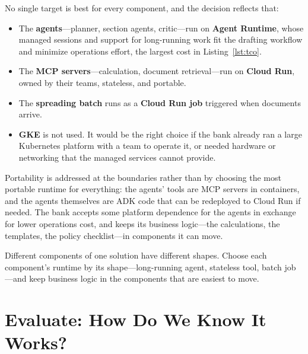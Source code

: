 No single target is best for every component, and the decision reflects that:
\begin{itemize}[itemsep=1pt]
  \item The \textbf{agents}---planner, section agents, critic---run on \textbf{Agent Runtime}, whose managed sessions and support for long-running work fit the drafting workflow and minimize operations effort, the largest cost in Listing~\ref{lst:tco}.
  \item The \textbf{MCP servers}---calculation, document retrieval---run on \textbf{Cloud Run}, owned by their teams, stateless, and portable.
  \item The \textbf{spreading batch} runs as a \textbf{Cloud Run job} triggered when documents arrive.
  \item \textbf{GKE} is not used. It would be the right choice if the bank already ran a large Kubernetes platform with a team to operate it, or needed hardware or networking that the managed services cannot provide.
\end{itemize}

Portability is addressed at the boundaries rather than by choosing the most portable runtime for everything: the agents' tools are MCP servers in containers, and the agents themselves are ADK code that can be redeployed to Cloud Run if needed. The bank accepts some platform dependence for the agents in exchange for lower operations cost, and keeps its business logic---the calculations, the templates, the policy checklist---in components it can move.

\begin{principle}
Different components of one solution have different shapes. Choose each component's runtime by its shape---long-running agent, stateless tool, batch job---and keep business logic in the components that are easiest to move.
\end{principle}

\section{Evaluate: How Do We Know It Works?}
\label{sec:loan-evaluate}

